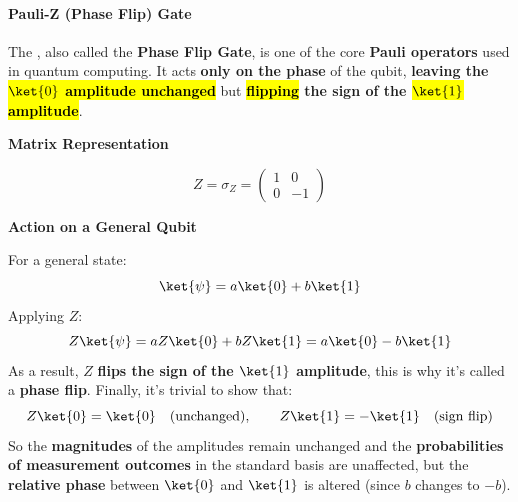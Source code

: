 \paragraph{Pauli-Z (Phase Flip) Gate}\label{sec:pauli-z-phase-flip-gate}

The , also called the \textbf{Phase Flip Gate}, is one of the core \textbf{Pauli operators} used in quantum computing. It acts \textbf{only on the phase} of the qubit, \textbf{leaving the \hl{$\ket{0}$ amplitude unchanged}} but \textbf{\hl{flipping} the sign of the \hl{$\ket{1}$ amplitude}}.

\highspace
\begin{flushleft}
    \textcolor{Green3}{ \textbf{Matrix Representation}}
\end{flushleft}
\begin{equation}
    Z = \sigma_{Z} = 
    \begin{pmatrix}
        1 & 0 \\
        0 & -1
    \end{pmatrix}
\end{equation}

\highspace
\begin{flushleft}
    \textcolor{Green3}{ \textbf{Action on a General Qubit}}
\end{flushleft}
For a general state:
\begin{equation*}
    \ket{\psi} = a\ket{0} + b\ket{1}
\end{equation*}
Applying $Z$:
\begin{equation*}
    Z\ket{\psi} = aZ\ket{0} + bZ\ket{1} = a\ket{0} - b\ket{1}
\end{equation*}
As a result, $Z$ \textbf{flips the sign of the $\ket{1}$ amplitude}, this is why it's called a \textbf{phase flip}. Finally, it's trivial to show that:
\begin{equation*}
    Z\ket{0} = \ket{0} \hspace{1em} \text{(unchanged)}, \hspace{2em} Z\ket{1} = -\ket{1} \hspace{1em} \text{(sign flip)}
\end{equation*}
So the \textbf{magnitudes} of the amplitudes remain unchanged and the \textbf{probabilities of measurement outcomes} in the standard basis are unaffected, but the \textbf{relative phase} between $\ket{0}$ and $\ket{1}$ is altered (since $b$ changes to $-b$).

